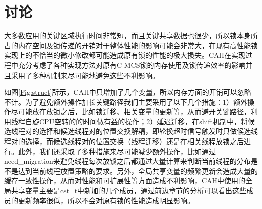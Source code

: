 \section{讨论}
大多数应用的关键区域执行时间非常短，而且关键共享数据也很少，所以锁本身所占的内存空间及锁传递的开销对于整体性能的影响可能会非常大，在现有高性能锁实现上的不恰当的微小修改都可能造成原有锁的性能的极大损失。CAH在实现过程中充分考虑了各种实现方法对原有C-MCS锁的内存使用及锁传递效率的影响并且采用了多种机制来尽可能地避免这些不利影响。

如图\ref{Fig:struct}所示，CAH中只增加了几个变量，所以内存方面的开销可以忽略不计。为了避免额外操作加长关键路径我们主要采用了以下几个措施：1）额外操作尽可能放在放锁之后，比如锁迁移、相关变量的更新等，从而避开关键路径，利用线程自旋CPU空转的的时间做有益的操作；2）延迟迁移，在shift机制中，将候选线程对的选择和候选线程对的位置交换解耦，即轮换超时信号触发时只做候选线程对的选择，而候选线程对的位置交换（线程迁移）还是在相关线程放锁之后进行。此外，我们还采取了多种措施来尽可能减少额外操作，比如通过need\_migration来避免线程每次放锁之后都通过大量计算来判断当前线程的分布是不是达到当前线程放置策略的要求。另外，全局共享变量的频繁更新会造成大量的缓存一致性操作，从而对性能和可扩展性等方面造成不利影响，CAH中使用的全局共享变量主要是cst\_t中新加的几个成员，通过前边章节的分析可以看出这些成员的更新频率很低，所以不会对原有锁的性能造成明显影响。
